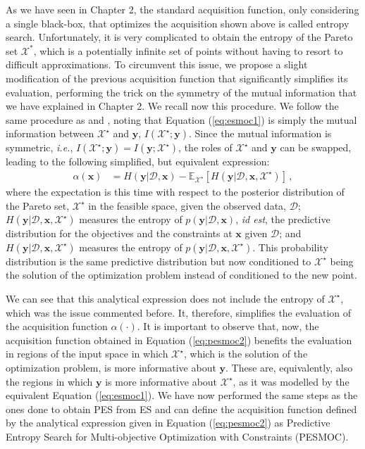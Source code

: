 As we have seen in Chapter 2, the standard acquisition function, only considering a single black-box, that optimizes the acquisition shown above is called entropy search. Unfortunately, it is very complicated to obtain the entropy of the Pareto set $\mathcal{X}^*$, which is a potentially infinite set of points without having to resort to difficult approximations.
To circumvent this issue, we propose a slight modification of the previous acquisition function that significantly simplifies its evaluation, performing the trick on the symmetry of the mutual information that we have explained in Chapter 2. We recall now this procedure.
We follow the same procedure as \cite{houlsby2012collaborative} and \cite{hernandez2014predictive}, noting that Equation
(\ref{eq:esmoc1}) is simply the mutual information between $\mathcal{X}^{\star}$ and $\textbf{y}$,
$I(\mathcal{X}^{\star};\mathbf{y})$. Since the
mutual information is symmetric, \emph{i.e.}, $I(\mathcal{X}^{\star};\mathbf{y})=I(\mathbf{y};\mathcal{X}^{\star})$, the
roles of $\mathcal{X}^{\star}$ and $\textbf{y}$ can be swapped, leading to the following simplified, but equivalent expression:
\begin{align}
\alpha(\mathbf{x}) & = 
H(\textbf{y}|\mathcal{D},\textbf{x}) - \mathbb{E}_{\mathcal{X}^{\star}} [H(\textbf{y}|\mathcal{D},\textbf{x},\mathcal{X}^{\star})]
\,, \label{eq:pesmoc2}
\end{align}
where the expectation is this time with respect to the posterior distribution of
the Pareto set, $\mathcal{X}^{\star}$ in the feasible space, given the observed
data, $\mathcal{D}$; $H(\textbf{y}|\mathcal{D},\textbf{x},\mathcal{X}^{\star})$ measures the entropy of
$p(\mathbf{y}|\mathcal{D}, \textbf{x})$, \emph{id est}, the predictive distribution
for the objectives and the constraints at $\mathbf{x}$ given $\mathcal{D}$;
and $H(\textbf{y}|\mathcal{D},\textbf{x},\mathcal{X}^{\star})$ measures the entropy of
$p(\mathbf{y}|\mathcal{D}, \textbf{x}, \mathcal{X}^{\star} )$. This probability distribution is the same predictive
distribution but now conditioned to $\mathcal{X}^{\star}$ being the solution of the optimization problem instead of conditioned to the new point.

We can see that this analytical expression does not include the entropy of $\mathcal{X}^\star$, which was the issue commented before. It, therefore, simplifies the evaluation of the acquisition function $\alpha(\cdot)$. It is important to observe that, now, the acquisition function obtained in Equation (\ref{eq:pesmoc2}) benefits the evaluation in regions of
the input space in which $\mathcal{X}^\star$, which is the solution of the optimization problem,
is more informative about $\mathbf{y}$. These are, equivalently, also the regions in which $\mathbf{y}$ is more informative about $\mathcal{X}^\star$, as it was modelled by the equivalent Equation (\ref{eq:esmoc1}). We have now performed the same steps as the ones done to obtain PES from ES and can define the acquisition function defined by the analytical expression given in Equation (\ref{eq:pesmoc2}) as Predictive
Entropy Search for Multi-objective Optimization with Constraints (PESMOC).


